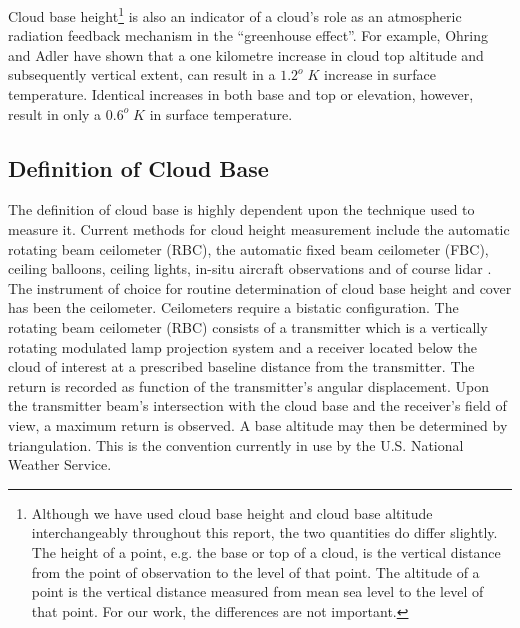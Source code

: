 Cloud base height\footnote{Although we have used cloud base height
and cloud base altitude interchangeably throughout this report,
the two quantities do differ slightly. 
The height of a point, e.g. the base or
top of a cloud, is the vertical distance from the
point of observation to the level of that point. The altitude
of a point is the vertical distance measured from mean sea level
to the level of that point\cite{WMO}. For our work, the differences are not
important.} is also an indicator of a cloud's role as an
atmospheric radiation feedback mechanism in the ``greenhouse effect''.  
For example, Ohring and Adler \cite{geh} 
have shown that a one kilometre increase in cloud
top altitude and subsequently vertical extent, 
can result in a $1.2^{o}\;K$ increase in surface
temperature. Identical increases in both base and
top or elevation, however, result in 
only a $0.6^{o}\;K$ in surface temperature.

\subsection{Definition of Cloud Base}

The definition of cloud base is highly dependent upon the
technique used to measure it.
Current methods for cloud height measurement include
the automatic rotating beam ceilometer (RBC), 
the automatic fixed beam ceilometer (FBC), ceiling balloons, 
ceiling lights, in-situ aircraft observations and of course 
lidar \cite{wle}. The instrument of choice 
for routine determination of cloud base height and cover has been 
the ceilometer. Ceilometers require a bistatic configuration. 
The rotating beam ceilometer (RBC) consists of a 
transmitter which is a vertically rotating modulated
lamp projection system and a receiver located below the cloud of
interest at a prescribed baseline distance from the transmitter. 
The return is recorded as function of the transmitter's angular displacement. 
Upon the transmitter beam's intersection with the cloud base
and the receiver's field of view, a maximum return is observed. 
A base altitude may then be determined by  triangulation. This is
the convention currently in use by the U.S. National Weather Service. 

